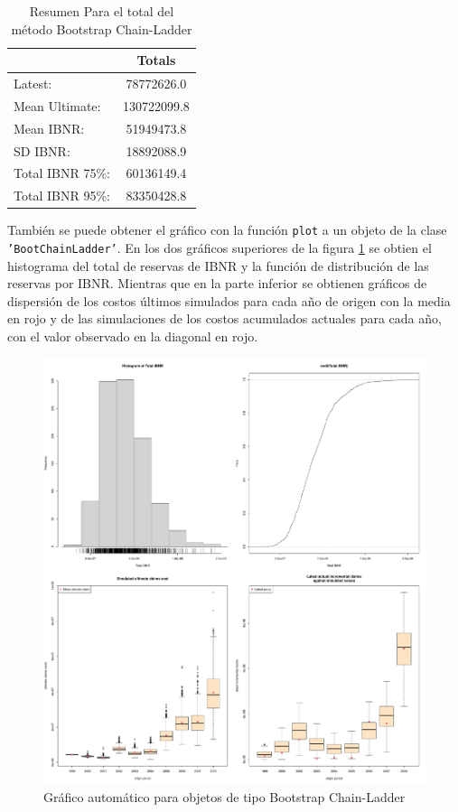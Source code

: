 \documentclass[
  12pt,
]{article}
\begin{document}
\begin{table}[ht]
\centering
\caption{Resumen Para el total del método Bootstrap Chain-Ladder} 
\label{total bootstrap}
\begin{tabular}{lc}
  \hline
 & Totals \\ 
  \hline
Latest: & 78772626.0 \\ 
  Mean Ultimate: & 130722099.8 \\ 
  Mean IBNR: & 51949473.8 \\ 
  SD IBNR: & 18892088.9 \\ 
  Total IBNR 75\%: & 60136149.4 \\ 
  Total IBNR 95\%: & 83350428.8 \\ 
   \hline
\end{tabular}
\end{table}

También se puede obtener el gráfico con la función \texttt{plot} a un
objeto de la clase \texttt{'BootChainLadder'}. En los dos gráficos
superiores de la figura \ref{plotBoot} se obtien el histograma del total
de reservas de IBNR y la función de distribución de las reservas por
IBNR. Mientras que en la parte inferior se obtienen gráficos de
dispersión de los costos últimos simulados para cada año de origen con
la media en rojo y de las simulaciones de los costos acumulados actuales
para cada año, con el valor observado en la diagonal en rojo.

\begin{figure}
\centering
\includegraphics{informe_files/figure-latex/unnamed-chunk-36-1.pdf}
\caption{\label{plotBoot} Gráfico automático para objetos de tipo
Bootstrap Chain-Ladder}
\end{figure}
\end{document}

